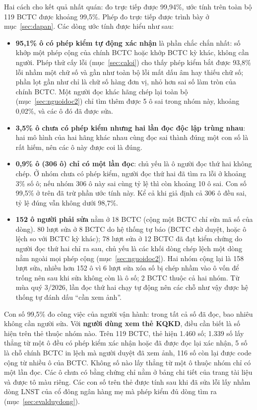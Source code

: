 \documentclass[12pt,a4paper]{report}
\newcommand{\enquote}[1]{“#1”}
\begin{document}
Hai cách cho kết quả nhất quán: đo trực tiếp được 99,94\%, ước tính trên toàn bộ 119 BCTC được khoảng 99,5\%. Phép đo trực
tiếp được trình bày ở mục~\ref{sec:dapan}. Các dòng ước tính được hiểu như sau:
\begin{itemize}
  \item \textbf{95,1\% ô có phép kiểm tự động xác nhận} là phần chắc chắn nhất: số khớp một phép cộng của chính BCTC hoặc
        khớp BCTC kỳ khác, không cần người. Phép thử cấy lỗi (mục~\ref{sec:caloi}) cho thấy phép kiểm bắt được 93,8\% lỗi
        nhầm một chữ số và gần như toàn bộ lỗi mất dấu âm hay thiếu chữ số; phần lọt gần như chỉ là chữ số hàng đơn vị,
        nhỏ hơn sai số làm tròn của chính BCTC. Một người đọc khác hãng chép lại toàn bộ (mục~\ref{sec:nguoidoc2}) chỉ
        tìm thêm được 5 ô sai trong nhóm này, khoảng 0,02\%, và các ô đó đã được sửa.
  \item \textbf{3,5\% ô chưa có phép kiểm nhưng hai lần đọc độc lập trùng nhau}: hai mô hình của hai hãng khác nhau cùng
        đọc sai thành đúng một con số là rất hiếm, nên các ô này được coi là đúng.
  \item \textbf{0,9\% ô (306 ô) chỉ có một lần đọc}: chủ yếu là ô người đọc thứ hai không chép. Ở nhóm chưa có phép kiểm,
        người đọc thứ hai đã tìm ra lỗi ở khoảng 3\% số ô; nếu nhóm 306 ô này sai cùng tỷ lệ thì còn khoảng 10 ô
        sai. Con số 99,5\% ở trên đã trừ phần ước tính này. Kể cả khi giả định cả 306 ô đều sai, tỷ lệ đúng vẫn không
        dưới 98,7\%.
  \item \textbf{152 ô người phải sửa} nằm ở 18 BCTC (cộng một BCTC chỉ sửa mã số của dòng). 80 lượt sửa ở 8 BCTC do hệ
        thống tự báo (BCTC chờ duyệt, hoặc ô lệch so với BCTC kỳ khác); 78 lượt sửa ở 12 BCTC đã đạt kiểm chứng do
        người đọc thứ hai chỉ ra sau, chủ yếu là các khối dòng chép lệch một dòng nằm ngoài mọi phép cộng
        (mục~\ref{sec:nguoidoc2}). Hai nhóm cộng lại là 158 lượt sửa, nhiều hơn 152 ô vì 6 lượt sửa xóa số bị chép nhầm
        vào ô vốn để trống nên sau khi sửa không còn là ô số; 2 BCTC thuộc cả hai nhóm. Từ mùa quý 3/2026, lần đọc thứ
        hai chạy tự động nên các chỗ như vậy được hệ thống tự đánh dấu \enquote{cần xem ảnh}.
\end{itemize}

Con số 99,5\% đo công việc của người vận hành: trong tất cả số đã đọc, bao nhiêu không cần người sửa. Với
\textbf{người dùng xem thẻ KQKD}, điều cần biết là số hiện trên thẻ thuộc nhóm nào. Trên 119 BCTC, thẻ hiện 1.460 số;
1.339 số lấy thẳng từ một ô đều có phép kiểm xác nhận hoặc đã được đọc lại xác nhận, 5 số là chỗ chính BCTC in lệch
mà người duyệt đã xem ảnh, 116 số còn lại được code cộng từ nhiều ô của BCTC. Không số nào lấy thẳng từ một ô thuộc nhóm chỉ
có một lần đọc. Các ô chưa có bằng chứng chỉ nằm ở bảng chi tiết của trang tài liệu và được tô màu riêng. Các con số
trên thẻ được tính sau khi đã sửa lỗi lấy nhầm dòng LNST của cổ đông ngân hàng mẹ mà phép kiểm đủ dòng tìm ra
(mục~\ref{sec:evalduydong}).
\end{document}
